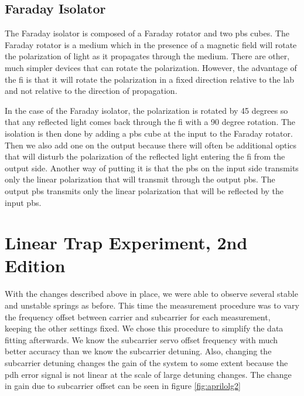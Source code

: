 \subsection{Faraday Isolator}
The Faraday isolator is composed of a Faraday rotator and two \ac{pbs} cubes.
The Faraday rotator is a medium which in the presence of a magnetic field
will rotate the polarization of light as it propagates through the medium.
There are other, much simpler devices that can rotate the polarization.
However, the advantage of the \ac{fi} is that it will rotate the polarization
in a fixed direction relative to the lab and not relative to the direction
of propagation.

In the case of the Faraday isolator, the polarization is rotated by 45 degrees
so that any reflected light comes back through the \ac{fi} with a 90 degree
rotation.
The isolation is then done by adding a \ac{pbs} cube at the input to the
Faraday rotator. Then we also add one on the output because there will often be
additional optics that will disturb the polarization of the reflected light
entering the \ac{fi} from the output side.
Another way of putting it is that the \ac{pbs} on the input side transmits
only the linear polarization that will transmit through the output \ac{pbs}.
The output \ac{pbs} transmits only the linear polarization that will be
reflected by the input \ac{pbs}.


\section{Linear Trap Experiment, 2nd Edition}
\label{sec:results_second}
With the changes described above in place, we were able to observe several
stable and unstable springs as before.
This time the measurement procedure was to vary the frequency offset between
carrier and subcarrier for each measurement, keeping the other settings fixed.
We chose this procedure to simplify the data fitting afterwards.
We know the subcarrier servo offset frequency with much better accuracy than we
know the subcarrier detuning.
Also, changing the subcarrier detuning changes the gain of the system to some
extent because the \ac{pdh} error signal is not linear at the scale of large
detuning changes. The change in gain due to subcarrier offset can be seen in
figure \ref{fig:aprilolg2}

